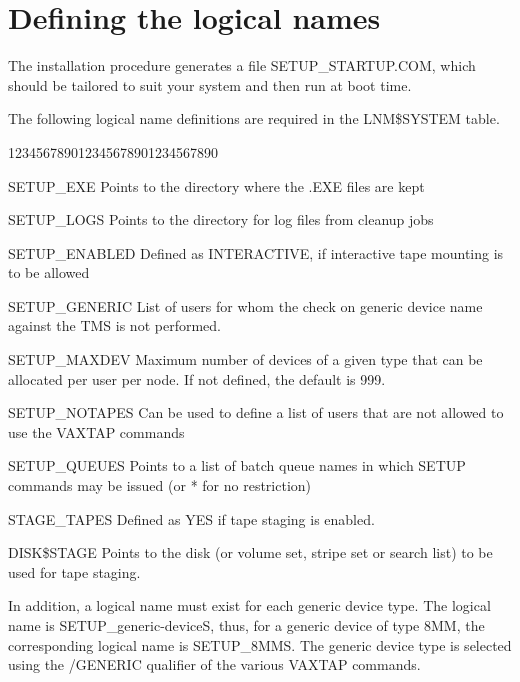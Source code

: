 \section{Defining the logical names}
\par
The installation procedure generates a file SETUP\_STARTUP.COM,
which should be tailored to suit your system and then run
at boot time.
\par
The following logical name definitions are required in the LNM\$SYSTEM table.
\begin{DLtt}{123456789012345678901234567890}
\item[SETUP\_EXE]Points to the directory where the .EXE files are kept
\item[SETUP\_LOGS]Points to the directory for log files from cleanup jobs
\item[SETUP\_ENABLED]Defined as INTERACTIVE, if interactive tape mounting
is to be allowed
\item[SETUP\_GENERIC]List of users for whom the check on generic device
name against the TMS is not performed.
\item[SETUP\_MAXDEV]Maximum number of devices of a given type
that can be allocated per user per node. If not defined, the default is 999.
\item[SETUP\_NOTAPES]Can be used to define a list of users that are not
allowed to use the VAXTAP commands
\item[SETUP\_QUEUES]Points to a list of batch queue names in which
SETUP commands may be issued (or * for no restriction)
\item[STAGE\_TAPES]Defined as YES if tape staging is enabled.
\item[DISK\$STAGE]Points to the disk (or volume set, stripe set or
search list) to be used for tape staging.
\end{DLtt}
\par
In addition, a logical name must exist for each generic device type.
The logical name is SETUP\_generic-deviceS, thus, for a generic
device of type 8MM, the corresponding logical name is SETUP\_8MMS.
The generic device type is selected using the /GENERIC qualifier of
the various VAXTAP commands.
